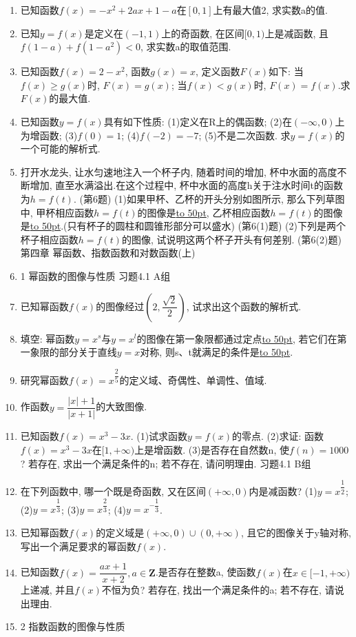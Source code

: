 \documentclass[10pt,a4paper]{article}
\newcommand{\blank}[1]{\underline{\hbox to #1pt{}}}
\begin{document}
\begin{enumerate}[1.]
\item 已知函数$f(x)=-x^2+2ax+1-a$在$[0,1]$上有最大值2, 求实数a的值.
\item 已知$y=f(x)$是定义在$(-1,1)$上的奇函数, 在区间$[0,1)$上是减函数, 且$f(1-a)+f(1-a^2)<0$, 求实数a的取值范围.
\item 已知函数$f(x)=2-x^2$, 函数$g(x)=x$, 定义函数$F(x)$如下: 当$f(x)\ge g(x)$时, $F(x)=g(x)$; 当$f(x)<g(x)$时, $F(x)=f(x)$.求$F(x)$的最大值.
\item 已知函数$y=f(x)$具有如下性质: (1)定义在R上的偶函数; (2)在$(-\infty ,0)$上为增函数; (3)$f(0)=1$; (4)$f(-2)=-7$; (5)不是二次函数.
求$y=f(x)$的一个可能的解析式.
\item 打开水龙头, 让水匀速地注入一个杯子内, 随着时间的增加, 杯中水面的高度不断增加, 直至水满溢出.在这个过程中, 杯中水面的高度h关于注水时间t的函数为$h=f(t)$.
(第6题)
(1)如果甲杯、乙杯的开头分别如图所示, 那么下列草图中, 甲杯相应函数$h=f(t)$的图像是\blank{50}, 乙杯相应函数$h=f(t)$的图像是\blank{50}.(只有杯子的圆柱和圆锥形部分可以盛水)
(第6(1)题)
(2)下列是两个杯子相应函数$h=f(t)$的图像, 试说明这两个杯子开头有何差别.
(第6(2)题)
第四章  幂函数、指数函数和对数函数(上)
\item 1  幂函数的图像与性质
习题4.1  A组
\item 已知幂函数$f(x)$的图像经过$(2,\dfrac{\sqrt 2}2)$, 试求出这个函数的解析式.
\item 填空:
幂函数$y=x^s$与$y=x^l$的图像在第一象限都通过定点\blank{50}, 若它们在第一象限的部分关于直线$y=x$对称, 则s、t就满足的条件是\blank{50}.
\item 研究幂函数$f(x)=x^{\dfrac 25}$的定义域、奇偶性、单调性、值域.
\item 作函数$y=\dfrac{|x|+1}{|x+1|}$的大致图像.
\item 已知函数$f(x)=x^3-3x$.
(1)试求函数$y=f(x)$的零点.
(2)求证: 函数$f(x)=x^3-3x$在$[1,+\infty)$上是增函数.
(3)是否存在自然数n, 使$f(n)=1000$? 若存在, 求出一个满足条件的n; 若不存在, 请问明理由.
习题4.1  B组
\item 在下列函数中, 哪一个既是奇函数, 又在区间$(+\infty ,0)$内是减函数?
(1)$y=x^{\dfrac 12}$; 		(2)$y=x^{\dfrac 13}$; 		(3)$y=x^{\dfrac 23}$; 		(4)$y=x^{-\dfrac 13}$.
\item 已知幂函数$f(x)$的定义域是$(+\infty ,0)\cup (0,+\infty)$, 且它的图像关于y轴对称, 写出一个满足要求的幂函数$f(x)$.
\item 已知函数$f(x)=\dfrac{ax+1}{x+2},a\in \mathbf{Z}$.是否存在整数a, 使函数$f(x)$在$x\in [-1,+\infty)$上递减, 并且$f(x)$不恒为负? 若存在, 找出一个满足条件的a; 若不存在, 请说出理由.
\item 2  指数函数的图像与性质

\end{enumerate}
\end{document}
